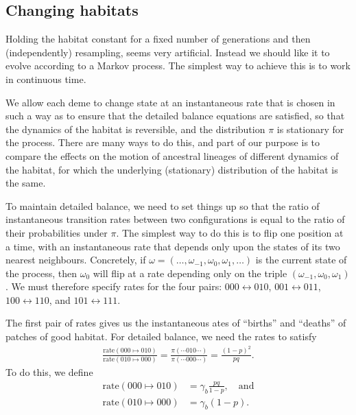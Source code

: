 \documentclass{article}
\newcommand{\rate}[2]{\text{rate}(#1\mapsto#2)}
\begin{document}
\subsection{Changing habitats}

Holding the habitat constant for a fixed number of generations and then (independently) resampling, 
seems very artificial. 
Instead we should like it to evolve according to a Markov process. 
The simplest way to achieve this is to work in continuous time.

We allow each deme to change state at an instantaneous rate that is chosen in such a way
as to ensure that the detailed balance equations are satisfied, 
so that the dynamics of the habitat is reversible, 
and the distribution $\pi$ is stationary for the process. 
There are many ways to do this,
and part of our purpose is to compare 
the effects on the motion of ancestral lineages of different dynamics of the habitat, 
for which the underlying (stationary) distribution of the habitat is the same.

To maintain detailed balance, we need to set things up so that
the ratio of instantaneous transition rates between two configurations
is equal to the ratio of their probabilities under $\pi$.
The simplest way to do this is to flip one position at a time,
with an instantaneous rate that depends only upon the states of its two nearest neighbours. 
Concretely, if $\omega = (\ldots, \omega_{-1}, \omega_0, \omega_1, \ldots)$
is the current state of the process, then $\omega_0$ will flip
at a rate depending only on the triple $(\omega_{-1}, \omega_0, \omega_1)$.
We must therefore specify rates for the four pairs: 
$000 \leftrightarrow 010$,
$001 \leftrightarrow 011$,
$100 \leftrightarrow 110$,
and $101 \leftrightarrow 111$.

The first pair of rates gives us the instantaneous ates of
 ``births'' and ``deaths'' of patches of good habitat.
For detailed balance, we need the rates to satisfy
\begin{align*}
    \frac{\rate{000}{010}}{\rate{010}{000}}
    =
    \frac{\pi(\cdots010\cdots)}{\pi(\cdots000\cdots)}
    =
    \frac{(1-p)^2}{pq} .
\end{align*}
To do this, we define
\begin{align}
    \rate{000}{010} &= \gamma_b \frac{pq}{1-p}, \quad \text{and}\\
    \rate{010}{000} &= \gamma_b (1-p) .
\end{align}
\end{document}
